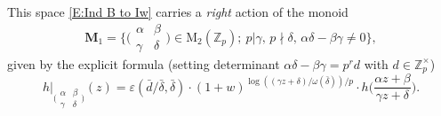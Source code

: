 \documentclass[12pt]{amsart}
\theoremstyle{definition}
\numberwithin{equation}{subsection}
\def\calC{\mathcal{C}}
\def\calO{\mathcal{O}}
\def\ZZ{\mathbb{Z}}
\def\rmH{\mathrm{H}}
\def\rmM{\mathrm{M}}
\def\rmS{\mathrm{S}}
\DeclareMathOperator{\Hom}{Hom}
\newcommand{\Iw}{\mathrm{Iw}}
\newcommand{\Matrix}[4]{{\big(\begin{smallmatrix}#1&#2\\#3& #4\end{smallmatrix} \big)}}
\begin{document}
This space \eqref{E:Ind B to Iw} carries a \emph{right} action of the monoid
$$
\mathbf{M}_1=\big\{\Matrix \alpha\beta\gamma\delta \in \rmM_2(\ZZ_p);  \ p|\gamma,\,p\nmid \delta,\, \alpha \delta-\beta \gamma \neq 0\big\},
$$ 
given by the explicit formula (setting determinant $\alpha \delta - \beta\gamma = p^r d$ with $d \in \ZZ_p^\times$)
\begin{equation}
\label{E:induced representation action extended}
h\big|_{\Matrix \alpha\beta{\gamma}\delta}(z) = \varepsilon(\bar d /  \bar \delta, \bar \delta) \cdot (1+w)^{\log\left((\gamma z+\delta )/ \omega(\bar \delta)\right)/p} \cdot h\Big( \frac{\alpha z+\beta}{\gamma z+\delta}\Big).
\end{equation}


\end{document}
